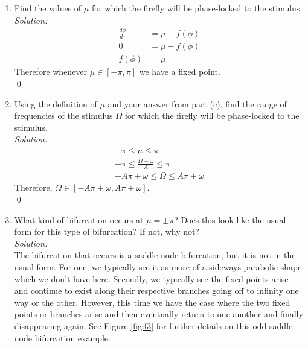 \documentclass[10pt]{amsart}
\theoremstyle{nonumberplain}
\begin{document}
\begin{enumerate}[label={\bf {\arabic*}:}]
\begin{enumerate}
\item Find the values of $\mu$ for which the firefly will be phase-locked to the stimulus. \\
\textit{Solution:} \\
\begin{align*}
\frac {d \phi} {d \tau} &= \mu - f(\phi) \\
0 &= \mu - f(\phi) \\
f(\phi) &= \mu
\end{align*}
Therefore whenever $\mu \in [-\pi, \pi]$ we have a fixed point. \\
\qed \\

\item Using the definition of $\mu$ and your answer from part (c), find the range of
frequencies of the stimulus $\Omega$ for which the firefly will be phase-locked to the
stimulus. \\
\textit{Solution:} \\
\begin{align*}
-\pi \leq \mu \leq \pi \\
-\pi \leq \frac {\Omega - \omega} A \leq \pi \\
-A\pi + \omega \leq \Omega \leq A\pi + \omega
\end{align*}
Therefore, $\Omega \in [-A\pi + \omega, A\pi + \omega]$. \\
\qed \\

\item What kind of bifurcation occurs at $\mu = \pm \pi$? Does this look like the usual
form for this type of bifurcation? If not, why not? \\
\textit{Solution:} \\
The bifurcation that occurs is a saddle node bifurcation, but it is not in the usual form.
For one, we typically see it as more of a sideways parabolic shape which we don't have here.
Secondly, we typically see the fixed points arise and continue to exist along their respective branches going off to infinity one way or the other.
However, this time we have the case where the two fixed points or branches arise and then eventually return to one another and finally disappearing again.
See Figure \ref{fig:f3} for further details on this odd saddle node bifurcation example. \\


\end{enumerate}
\end{enumerate}
\end{document}

